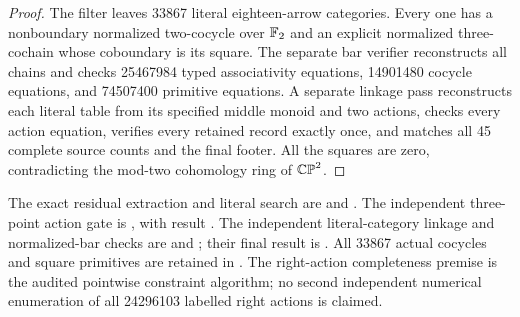 \begin{proof}
The filter leaves 33867 literal eighteen-arrow categories.
Every one has a nonboundary normalized two-cocycle over $\mathbb F_2$ and
an explicit normalized three-cochain whose coboundary is its square.
The separate bar verifier reconstructs all chains and checks
25467984 typed associativity equations, 14901480 cocycle equations,
and 74507400 primitive equations.  A separate linkage pass reconstructs
each literal table from its specified middle monoid and two actions,
checks every action equation, verifies every retained record exactly
once, and matches all 45 complete source counts and the final footer.
All the squares are zero, contradicting the mod-two cohomology ring
of $\mathbb {CP}^2$.
\end{proof}

\begin{remark}\label{C:middle-six-three-six-verification}
The exact residual extraction and literal search are
 and
.
The independent three-point action gate is
, with result
.
The independent literal-category linkage and normalized-bar checks are
 and
; their final result is
.
All 33867 actual cocycles and square primitives are retained in
.
The right-action completeness premise is the audited pointwise
constraint algorithm; no second independent numerical enumeration of
all 24296103 labelled right actions is claimed.
\end{remark}
